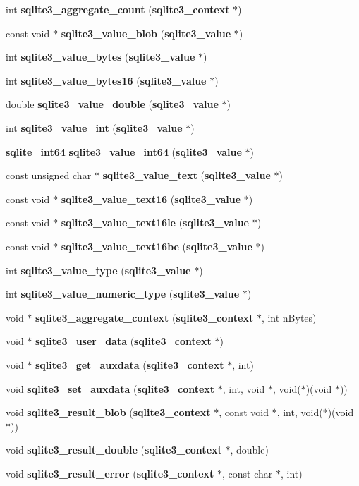 \begin{DoxyCompactItemize}
\item 
int {\bf sqlite3\_\-aggregate\_\-count} ({\bf sqlite3\_\-context} $\ast$)
\item 
const void $\ast$ {\bf sqlite3\_\-value\_\-blob} ({\bf sqlite3\_\-value} $\ast$)
\item 
int {\bf sqlite3\_\-value\_\-bytes} ({\bf sqlite3\_\-value} $\ast$)
\item 
int {\bf sqlite3\_\-value\_\-bytes16} ({\bf sqlite3\_\-value} $\ast$)
\item 
double {\bf sqlite3\_\-value\_\-double} ({\bf sqlite3\_\-value} $\ast$)
\item 
int {\bf sqlite3\_\-value\_\-int} ({\bf sqlite3\_\-value} $\ast$)
\item 
{\bf sqlite\_\-int64} {\bf sqlite3\_\-value\_\-int64} ({\bf sqlite3\_\-value} $\ast$)
\item 
const unsigned char $\ast$ {\bf sqlite3\_\-value\_\-text} ({\bf sqlite3\_\-value} $\ast$)
\item 
const void $\ast$ {\bf sqlite3\_\-value\_\-text16} ({\bf sqlite3\_\-value} $\ast$)
\item 
const void $\ast$ {\bf sqlite3\_\-value\_\-text16le} ({\bf sqlite3\_\-value} $\ast$)
\item 
const void $\ast$ {\bf sqlite3\_\-value\_\-text16be} ({\bf sqlite3\_\-value} $\ast$)
\item 
int {\bf sqlite3\_\-value\_\-type} ({\bf sqlite3\_\-value} $\ast$)
\item 
int {\bf sqlite3\_\-value\_\-numeric\_\-type} ({\bf sqlite3\_\-value} $\ast$)
\item 
void $\ast$ {\bf sqlite3\_\-aggregate\_\-context} ({\bf sqlite3\_\-context} $\ast$, int nBytes)
\item 
void $\ast$ {\bf sqlite3\_\-user\_\-data} ({\bf sqlite3\_\-context} $\ast$)
\item 
void $\ast$ {\bf sqlite3\_\-get\_\-auxdata} ({\bf sqlite3\_\-context} $\ast$, int)
\item 
void {\bf sqlite3\_\-set\_\-auxdata} ({\bf sqlite3\_\-context} $\ast$, int, void $\ast$, void($\ast$)(void $\ast$))
\item 
void {\bf sqlite3\_\-result\_\-blob} ({\bf sqlite3\_\-context} $\ast$, const void $\ast$, int, void($\ast$)(void $\ast$))
\item 
void {\bf sqlite3\_\-result\_\-double} ({\bf sqlite3\_\-context} $\ast$, double)
\item 
void {\bf sqlite3\_\-result\_\-error} ({\bf sqlite3\_\-context} $\ast$, const char $\ast$, int)

\end{DoxyCompactItemize}
